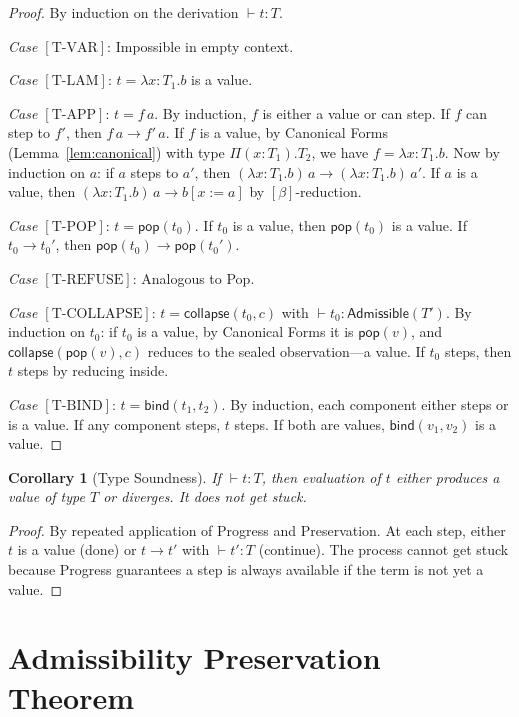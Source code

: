 \documentclass[12pt, a4paper, openany]{book}
\theoremstyle{plain}
\newtheorem{corollary}[theorem]{Corollary}
\theoremstyle{definition}
\theoremstyle{remark}
\newcommand{\Adm}{\mathsf{Admissible}}
\begin{document}
\begin{proof}
By induction on the derivation $\vdash t : T$.

\textit{Case $[\mathrm{T\text{-}VAR}]$}: Impossible in empty context.

\textit{Case $[\mathrm{T\text{-}LAM}]$}: $t = \lambda x:T_1.b$ is a value.

\textit{Case $[\mathrm{T\text{-}APP}]$}: $t = f\, a$. By induction, $f$ is either
a value or can step. If $f$ can step to $f'$, then $f\, a \to f'\, a$.
If $f$ is a value, by Canonical Forms (Lemma~\ref{lem:canonical}) with type
$\Pi(x:T_1).T_2$, we have $f = \lambda x:T_1.b$. Now by induction on $a$:
if $a$ steps to $a'$, then $(\lambda x:T_1.b)\, a \to (\lambda x:T_1.b)\, a'$.
If $a$ is a value, then $(\lambda x:T_1.b)\, a \to b[x:=a]$ by $[\beta]$-reduction.

\textit{Case $[\mathrm{T\text{-}POP}]$}: $t = \mathsf{pop}(t_0)$. If $t_0$ is a
value, then $\mathsf{pop}(t_0)$ is a value. If $t_0 \to t_0'$, then
$\mathsf{pop}(t_0) \to \mathsf{pop}(t_0')$.

\textit{Case $[\mathrm{T\text{-}REFUSE}]$}: Analogous to Pop.

\textit{Case $[\mathrm{T\text{-}COLLAPSE}]$}: $t = \mathsf{collapse}(t_0, c)$
with $\vdash t_0 : \Adm(T')$. By induction on $t_0$: if $t_0$ is a value,
by Canonical Forms it is $\mathsf{pop}(v)$, and $\mathsf{collapse}(\mathsf{pop}(v), c)$
reduces to the sealed observation---a value. If $t_0$ steps, then $t$ steps
by reducing inside.

\textit{Case $[\mathrm{T\text{-}BIND}]$}: $t = \mathsf{bind}(t_1, t_2)$. By
induction, each component either steps or is a value. If any component steps,
$t$ steps. If both are values, $\mathsf{bind}(v_1, v_2)$ is a value.
\end{proof}

\begin{corollary}[Type Soundness]
If $\vdash t : T$, then evaluation of $t$ either produces a value of type $T$
or diverges. It does not get stuck.
\end{corollary}

\begin{proof}
By repeated application of Progress and Preservation. At each step, either $t$
is a value (done) or $t \to t'$ with $\vdash t' : T$ (continue). The process
cannot get stuck because Progress guarantees a step is always available if the
term is not yet a value.
\end{proof}

\section{Admissibility Preservation Theorem}
\end{document}
